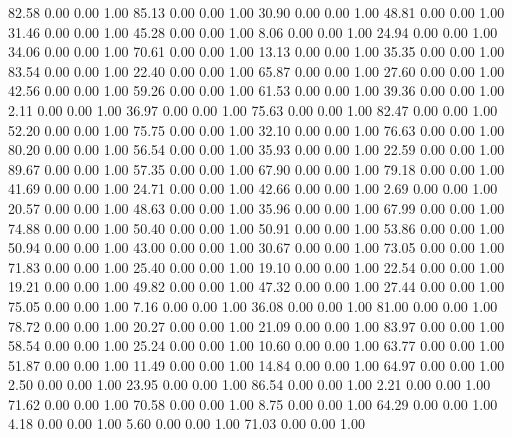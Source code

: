    82.58   0.00   0.00   1.00
   85.13   0.00   0.00   1.00
   30.90   0.00   0.00   1.00
   48.81   0.00   0.00   1.00
   31.46   0.00   0.00   1.00
   45.28   0.00   0.00   1.00
    8.06   0.00   0.00   1.00
   24.94   0.00   0.00   1.00
   34.06   0.00   0.00   1.00
   70.61   0.00   0.00   1.00
   13.13   0.00   0.00   1.00
   35.35   0.00   0.00   1.00
   83.54   0.00   0.00   1.00
   22.40   0.00   0.00   1.00
   65.87   0.00   0.00   1.00
   27.60   0.00   0.00   1.00
   42.56   0.00   0.00   1.00
   59.26   0.00   0.00   1.00
   61.53   0.00   0.00   1.00
   39.36   0.00   0.00   1.00
    2.11   0.00   0.00   1.00
   36.97   0.00   0.00   1.00
   75.63   0.00   0.00   1.00
   82.47   0.00   0.00   1.00
   52.20   0.00   0.00   1.00
   75.75   0.00   0.00   1.00
   32.10   0.00   0.00   1.00
   76.63   0.00   0.00   1.00
   80.20   0.00   0.00   1.00
   56.54   0.00   0.00   1.00
   35.93   0.00   0.00   1.00
   22.59   0.00   0.00   1.00
   89.67   0.00   0.00   1.00
   57.35   0.00   0.00   1.00
   67.90   0.00   0.00   1.00
   79.18   0.00   0.00   1.00
   41.69   0.00   0.00   1.00
   24.71   0.00   0.00   1.00
   42.66   0.00   0.00   1.00
    2.69   0.00   0.00   1.00
   20.57   0.00   0.00   1.00
   48.63   0.00   0.00   1.00
   35.96   0.00   0.00   1.00
   67.99   0.00   0.00   1.00
   74.88   0.00   0.00   1.00
   50.40   0.00   0.00   1.00
   50.91   0.00   0.00   1.00
   53.86   0.00   0.00   1.00
   50.94   0.00   0.00   1.00
   43.00   0.00   0.00   1.00
   30.67   0.00   0.00   1.00
   73.05   0.00   0.00   1.00
   71.83   0.00   0.00   1.00
   25.40   0.00   0.00   1.00
   19.10   0.00   0.00   1.00
   22.54   0.00   0.00   1.00
   19.21   0.00   0.00   1.00
   49.82   0.00   0.00   1.00
   47.32   0.00   0.00   1.00
   27.44   0.00   0.00   1.00
   75.05   0.00   0.00   1.00
    7.16   0.00   0.00   1.00
   36.08   0.00   0.00   1.00
   81.00   0.00   0.00   1.00
   78.72   0.00   0.00   1.00
   20.27   0.00   0.00   1.00
   21.09   0.00   0.00   1.00
   83.97   0.00   0.00   1.00
   58.54   0.00   0.00   1.00
   25.24   0.00   0.00   1.00
   10.60   0.00   0.00   1.00
   63.77   0.00   0.00   1.00
   51.87   0.00   0.00   1.00
   11.49   0.00   0.00   1.00
   14.84   0.00   0.00   1.00
   64.97   0.00   0.00   1.00
    2.50   0.00   0.00   1.00
   23.95   0.00   0.00   1.00
   86.54   0.00   0.00   1.00
    2.21   0.00   0.00   1.00
   71.62   0.00   0.00   1.00
   70.58   0.00   0.00   1.00
    8.75   0.00   0.00   1.00
   64.29   0.00   0.00   1.00
    4.18   0.00   0.00   1.00
    5.60   0.00   0.00   1.00
   71.03   0.00   0.00   1.00
